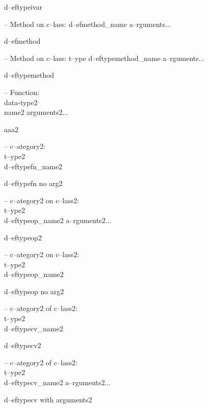 \documentclass{book}
\begin{document}
\begin{titlepage}
%
d--eftypeivar

\hbox{}-- Method on c--lass: d--efmethod\_name a--rguments...


%
d--efmethod

\hbox{}-- Method on c--lass: t--ype d--eftypemethod\_name a--rguments...


%
d--eftypemethod


\hbox{}-- Function:\leavevmode{}\\data-type2\leavevmode{}\\name2 arguments2...


%
aaa2

\hbox{}-- c--ategory2:\leavevmode{}\\t--ype2\leavevmode{}\\d--eftypefn\_name2


%
d--eftypefn no arg2

\hbox{}-- c--ategory2 on c--lass2:\leavevmode{}\\t--ype2\leavevmode{}\\d--eftypeop\_name2 a--rguments2...


%
d--eftypeop2

\hbox{}-- c--ategory2 on c--lass2:\leavevmode{}\\t--ype2\leavevmode{}\\d--eftypeop\_name2


%
d--eftypeop no arg2

\hbox{}-- c--ategory2 of c--lass2:\leavevmode{}\\t--ype2\leavevmode{}\\d--eftypecv\_name2


%
d--eftypecv2

\hbox{}-- c--ategory2 of c--lass2:\leavevmode{}\\t--ype2\leavevmode{}\\d--eftypecv\_name2 a--rguments2...


%
d--eftypecv with arguments2


\end{titlepage}
\end{document}
